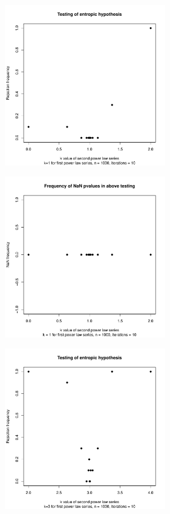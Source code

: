 \begin{figure}
    \centering
    \begin{subfigure}[b]{0.3\textwidth}
        \centering
        \includegraphics[height=7cm,keepaspectratio]{../../powerlaw/rejectionPlot,k1=1,n=1000,iterations=10.pdf}
    \end{subfigure}
    \hfill
    \begin{subfigure}[b]{0.5\textwidth}
        \centering
        \includegraphics[height=7cm,keepaspectratio]{../../powerlaw/NaNPlot,k1=1,n=1000,iterations=10.pdf}
    \end{subfigure}
    \vfill
    \begin{subfigure}[b]{0.3\textwidth}
        \centering
        \includegraphics[height=7cm,keepaspectratio]{../../powerlaw/rejectionPlot,k1=3,n=1000,iterations=10.pdf}

\end{subfigure}
\end{figure}
